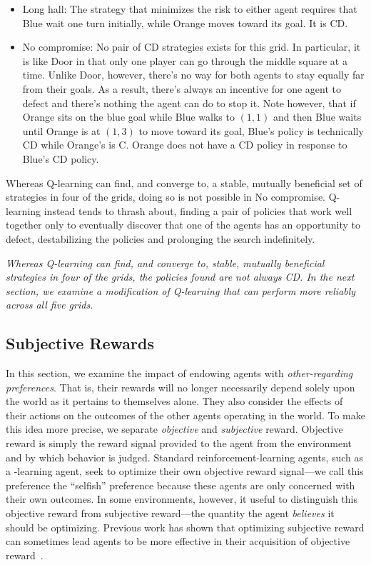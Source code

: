 \documentclass[letterpaper]{article}
\begin{document}
\begin{itemize}
\item{Long hall}: The strategy that minimizes the risk to either agent
requires that Blue wait one turn initially, while Orange
moves toward its goal. It is CD.

\item{No compromise}: No pair of CD strategies exists for this grid. In
particular, it is like Door in that only one player can go through the
middle square at a time. Unlike Door, however, there's no way for both
agents to stay equally far from their goals. As a result, there's
always an incentive for one agent to defect and there's nothing the
agent can do to stop it. Note however, that if Orange sits on the blue
goal while Blue walks to $(1,1)$ and then Blue waits until Orange is
at $(1,3)$ to move toward its goal, Blue's policy is technically CD
while Orange's is C. Orange does not have a CD policy in response to
Blue's CD policy.

\end{itemize}

Whereas Q-learning can find, and converge to, a stable, mutually
beneficial set of strategies in four of the grids, doing so is not
possible in No compromise. Q-learning instead tends to thrash about,
finding a pair of policies that work well together only to eventually
discover that one of the agents has an opportunity to defect,
destabilizing the policies and prolonging the search indefinitely.

\emph{Whereas Q-learning can find, and converge to, stable, mutually beneficial strategies in four of the grids, the policies found are not always CD. In the next section, we examine a modification of Q-learning that can perform more reliably across all five grids.}

\subsection{Subjective Rewards}

In this section, we examine the impact of endowing agents
with \emph{other-regarding preferences}. That is, their rewards will
no longer necessarily depend solely upon the world as it pertains to
themselves alone. They also consider the effects of their actions on
the outcomes of the other agents operating in the world. To make this
idea more precise, we separate \emph{objective} and \emph{subjective}
reward. Objective reward is simply the reward signal provided to the
agent from the environment and by which behavior is judged. Standard
reinforcement-learning agents, such as a \Q-learning agent,
seek to optimize their own objective reward signal---we call this preference the ``selfish''
preference because these agents are only concerned with their own outcomes. In
some environments, however, it useful to distinguish this objective
reward from subjective reward---the quantity the agent \emph{believes}
it should be optimizing. Previous work has shown that optimizing
subjective reward can sometimes lead agents to be more effective in
their acquisition of objective reward~\cite{singh09}.
\end{document}
